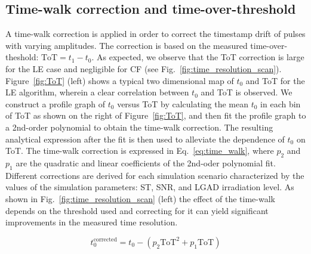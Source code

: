 \documentclass[preprint,1p]{elsarticle}
\begin{document}
\subsection{Time-walk correction and time-over-threshold}\label{sec:tw_and_tot}
A time-walk correction is applied in order to correct the timestamp drift of pulses with varying amplitudes.
The correction is based on the measured time-over-theshold: $\mathrm{ToT} = t_{1} - t_{0}$. As expected, we observe that the ToT correction
is large for the LE case and negligible for CF (see Fig.~\ref{fig:time_resolution_scan}).
Figure~\ref{fig:ToT} (left) shows a typical two dimensional map of $t_{0}$ and ToT for the
LE algorithm, wherein a clear correlation between $t_{0}$ and ToT is observed. 
We construct a profile graph of $t_{0}$ versus ToT by calculating the mean $t_{0}$ in
each bin of ToT as shown on the right of Figure~\ref{fig:ToT}, and then fit the profile graph to a 2nd-order polynomial to 
obtain the time-walk correction. The resulting analytical expression after the fit is then used to alleviate the dependence of $t_{0}$ on ToT.
The time-walk correction is expressed in Eq.~\ref{eq:time_walk}, where $p_{2}$ and $p_{1}$ are the quadratic
and linear coefficients of the 2nd-oder polynomial fit. Different corrections are derived for each simulation scenario
characterized by the values of the simulation parameters: ST, SNR, and LGAD irradiation level.
As shown in Fig.~\ref{fig:time_resolution_scan} (left) the effect of the time-walk depends on the threshold used and correcting for it
can yield significant improvements in the measured time resolution.

\begin{equation}\label{eq:time_walk}
  t_{0}^{\mathrm{corrected}} = t_{0}-(p_{2}\mathrm{ToT}^2+p_{1}\mathrm{ToT})
\end{equation}
\end{document}
